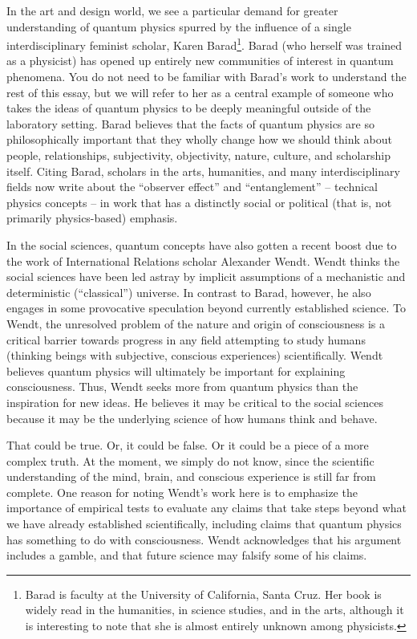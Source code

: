 \documentclass[12pt,onecolumn,preprintnumbers,amsmath,amssymbn,reprint,nofootinbib,superscriptaddress]{revtex4}    %
\begin{document}
In the art and design world, we see a particular demand for greater understanding of quantum physics spurred by the influence of a single interdisciplinary feminist scholar, Karen Barad\cite{Barad}\footnote{Barad is faculty at the University of California, Santa Cruz.  Her book \cite{Barad} is widely read in the humanities, in science studies, and in the arts, although it is interesting to note that she is almost entirely unknown among physicists.}.  Barad (who herself was trained as a physicist) has opened up entirely new communities of interest in quantum phenomena.  You do not need to be familiar with Barad's work to understand the rest of this essay, but we will refer to her as a central example of someone who takes the ideas of quantum physics to be deeply meaningful outside of the laboratory setting.  Barad believes that the facts of quantum physics are so philosophically important that they wholly change how we should think about people, relationships, subjectivity, objectivity, nature, culture, and scholarship itself. Citing Barad, scholars in the arts, humanities, and many interdisciplinary fields now write about the ``observer effect'' and ``entanglement'' -- technical physics concepts -- in work that has a distinctly social or political (that is, not primarily physics-based) emphasis.  

In the social sciences, quantum concepts have also gotten a recent boost due to the work of International Relations scholar Alexander Wendt\cite{Wendt}. Wendt thinks the social sciences have been led astray by implicit assumptions of a mechanistic and deterministic (``classical'') universe.  In contrast to Barad, however, he also engages in some provocative speculation beyond currently established science. To Wendt, the unresolved problem of the nature and origin of consciousness is a critical barrier towards progress in any field attempting to study humans (thinking beings with subjective, conscious experiences) scientifically.  Wendt believes quantum physics will ultimately be important for explaining consciousness.  Thus, Wendt seeks more from quantum physics than the inspiration for new ideas.  He believes it may be critical to the social sciences because it may be the underlying science of how humans think and behave.  

That could be true.  Or, it could be false.  Or it could be a piece of a more complex truth.  At the moment, we simply do not know, since the scientific understanding of the mind, brain, and conscious experience is still far from complete.  One reason for noting Wendt's work here is to emphasize the importance of empirical tests to evaluate any claims that take steps beyond what we have already established scientifically, including claims that quantum physics has something to do with consciousness. Wendt acknowledges that his argument includes a gamble, and that future science may falsify some of his claims.  
\end{document}
